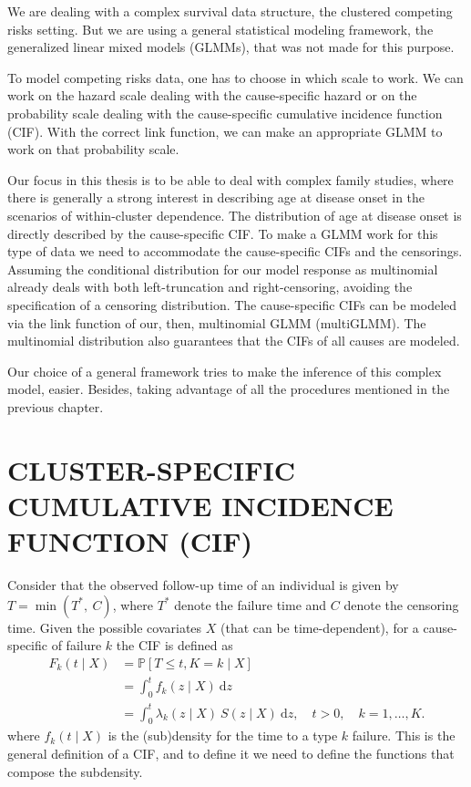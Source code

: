 We are dealing with a complex survival data structure, the clustered
competing risks setting. But we are using a general statistical modeling
framework, the generalized linear mixed models (GLMMs), that was not
made for this purpose.

To model competing risks data, one has to choose in which scale to work.
We can work on the hazard scale dealing with the cause-specific hazard
or on the probability scale dealing with the cause-specific cumulative
incidence function (CIF). With the correct link function, we can make an
appropriate GLMM to work on that probability scale.

Our focus in this thesis is to be able to deal with complex family
studies, where there is generally a strong interest in describing age at
disease onset in the scenarios of within-cluster dependence. The
distribution of age at disease onset is directly described by the
cause-specific CIF. To make a GLMM work for this type of data we need to
accommodate the cause-specific CIFs and the censorings. Assuming the
conditional distribution for our model response as multinomial already
deals with both left-truncation and right-censoring, avoiding the
specification of a censoring distribution. The cause-specific CIFs can
be modeled via the link function of our, then, multinomial GLMM
(multiGLMM). The multinomial distribution also guarantees that the CIFs
of all causes are modeled.

Our choice of a general framework tries to make the inference of this
complex model, easier. Besides, taking advantage of all the procedures
mentioned in the previous chapter.

\section{CLUSTER-SPECIFIC CUMULATIVE INCIDENCE FUNCTION
  (CIF)}
\label{cap:cif}

Consider that the observed follow-up time of an individual is given by
\(T = \min(T^{\ast},~C)\), where \(T^{\ast}\) denote the failure time
and \(C\) denote the censoring time. Given the possible covariates \(X\)
(that can be time-dependent), for a cause-specific of failure \(k\) the
CIF is defined as
\begin{align*}
  F_{k}(t \mid X) &= \mathbb{P}[T \leq t, K = k \mid X]\\
                  &= \int_{0}^{t} f_{k}(z \mid X)~\text{d}z\\
                  &= \int_{0}^{t} \lambda_{k}(z \mid X)~S(z \mid X)
                    ~\text{d}z, \quad t > 0, \quad k = 1, \dots, K.
\end{align*}
where \(f_{k}(t \mid X)\) is the (sub)density for the time to a type
\(k\) failure. This is the general definition of a CIF, and to define it
we need to define the functions that compose the subdensity.

